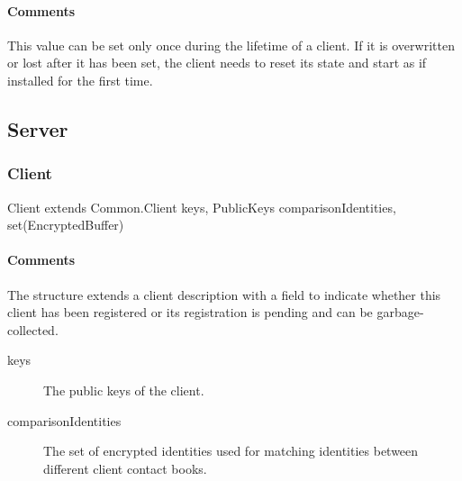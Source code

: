\documentclass[a4paper,10pt]{article}
\begin{document}
\begin{inparaitem}[ ]
 \item \unique
 \item \secure
 \item \persistent
\end{inparaitem}

\paragraph*{Comments}
This value can be set only once during the lifetime of a client. If it is overwritten or lost after it has been set, the client needs to reset its state and start as if installed 
for the first time.

\subsection{Server}
\label{sec:structure:server}

\subsubsection{Client}

\begin{verbbox}
Client extends Common.Client
{
  keys, PublicKeys
  comparisonIdentities, set(EncryptedBuffer)
}
\end{verbbox}
\begin{center}
\theverbbox
\end{center}

\begin{inparaitem}[ ]
 \item \infrastructure
\end{inparaitem}

\paragraph*{Comments}

The structure extends a client description with a field to indicate whether this client has been registered or its registration is pending and can be garbage-collected.

\SpecialItem
\begin{description}
 \item[keys] The public keys of the client.
 \item[comparisonIdentities] The set of encrypted identities used for matching identities between different client contact books.
\end{description}
\end{document}
